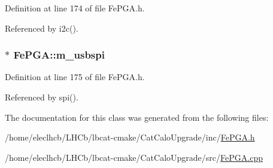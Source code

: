 Definition at line 174 of file FePGA.h.

Referenced by i2c().\hypertarget{classFePGA_a922a56250b29c9842cdb8095cae8c976}{
\subsubsection[{m\_\-usbspi}]{$\ast$ {\bf FePGA::m\_\-usbspi}}}
\label{classFePGA_a922a56250b29c9842cdb8095cae8c976}


Definition at line 175 of file FePGA.h.

Referenced by spi().

The documentation for this class was generated from the following files:\begin{DoxyCompactItemize}
\item 
/home/eleclhcb/LHCb/lbcat-\/cmake/CatCaloUpgrade/inc/\hyperlink{FePGA_8h}{FePGA.h}\item 
/home/eleclhcb/LHCb/lbcat-\/cmake/CatCaloUpgrade/src/\hyperlink{FePGA_8cpp}{FePGA.cpp}\end{DoxyCompactItemize}
